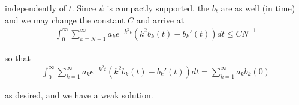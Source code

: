\documentclass{article}
\begin{document}
	independently of $t$. Since $\psi$ is compactly supported, the $b_{t}$ are as well (in time) and we may change the constant $C$ and arrive at 
	\begin{align*}
		\int_{0}^{\infty} \sum_{k=N+1}^{\infty} a_{k}e^{-k^{2}t}(k^{2}b_{k}(t) - b_{k}'(t)) dt \leq CN^{-1}
	\end{align*}
	
	so that 
	\begin{align*}
		\int_{0}^{\infty} \sum_{k=1}^{\infty}a_{k}e^{-k^{2}t} \left(k^{2}b_{k}(t) - b_{k}'(t) \right) dt = \sum_{k=1}^{\infty} a_{k}b_{k}(0)
	\end{align*}
	
	as desired, and we have a weak solution. 
\end{document}
